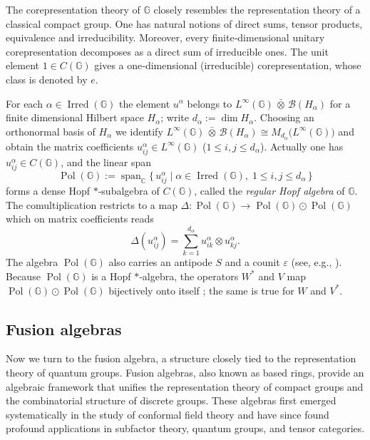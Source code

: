 \documentclass[12pt, reqno]{amsart}
\theoremstyle{definition}
\theoremstyle{remark}
\numberwithin{equation}{section}
\DeclareMathOperator{\Irred}{Irred}
\DeclareMathOperator{\Pol}{Pol}
\begin{document}
The corepresentation theory of $\mathbb{G}$ closely resembles the 
representation theory of a classical compact group. One has natural 
notions of direct sums, tensor products, equivalence and irreducibility. 
Moreover, every finite‑dimensional unitary corepresentation decomposes as 
a direct sum of irreducible ones. The unit element $1\in C(\mathbb{G})$ 
gives a one‑dimensional (irreducible) corepresentation, whose class is 
denoted by $e$.

For each $\alpha\in\Irred(\mathbb{G})$ the element $u^{\alpha}$ belongs to $L^{\infty}(\mathbb{G})\,\bar{\otimes}\,\mathcal{B}(H_{\alpha})$ for a 
finite dimensional Hilbert space $H_{\alpha}$; write $d_{\alpha}:=\dim H_{\alpha}$.  
Choosing an orthonormal basis of $H_{\alpha}$ we identify 
$L^{\infty}(\mathbb{G})\,\bar{\otimes}\,\mathcal{B}(H_{\alpha})
\cong M_{d_{\alpha}}\bigl(L^{\infty}(\mathbb{G})\bigr)$ and obtain the 
matrix coefficients $u_{ij}^{\alpha}\in L^{\infty}(\mathbb{G})$ 
($1\leq i,j\leq d_{\alpha}$). Actually one has $u_{ij}^{\alpha}\in C(\mathbb{G})$, 
and the linear span
\[
\Pol(\mathbb{G}):=\operatorname{span}_{\mathbb{C}}
\bigl\{\,u_{ij}^{\alpha}\mid \alpha\in\Irred(\mathbb{G}),\;1\leq i,j\leq d_{\alpha}\,\bigr\}
\]
forms a dense Hopf $*$‑subalgebra of $C(\mathbb{G})$, called the 
\emph{regular Hopf algebra} of $\mathbb{G}$. The comultiplication restricts 
to a map $\Delta:\Pol(\mathbb{G})\to\Pol(\mathbb{G})\odot\Pol(\mathbb{G})$ 
which on matrix coefficients reads
\begin{equation}
    \Delta(u_{ij}^{\alpha})=\sum_{k=1}^{d_{\alpha}} u_{ik}^{\alpha}\otimes u_{kj}^{\alpha}. \tag{2.5}
\end{equation}
The algebra $\Pol(\mathbb{G})$ also carries an antipode $S$ and a counit 
$\varepsilon$ (see, e.g., \cite[Theorem~5.4.1]{26}). Because 
$\Pol(\mathbb{G})$ is a Hopf $*$‑algebra, the operators $W^{*}$ and $V$ map 
$\Pol(\mathbb{G})\odot\Pol(\mathbb{G})$ bijectively onto itself 
\cite[Theorem~1.3.18]{26}; the same is true for $W$ and $V^{*}$.



\subsection{Fusion algebras}
Now we turn to the fusion algebra, a structure closely tied to the 
representation theory of quantum groups. 
Fusion algebras, also known as based rings, provide an algebraic framework 
that unifies the representation theory of compact groups and the combinatorial 
structure of discrete groups. These algebras first emerged systematically in 
the study of conformal field theory and have since found profound applications 
in subfactor theory, quantum groups, and tensor categories.
\end{document}
